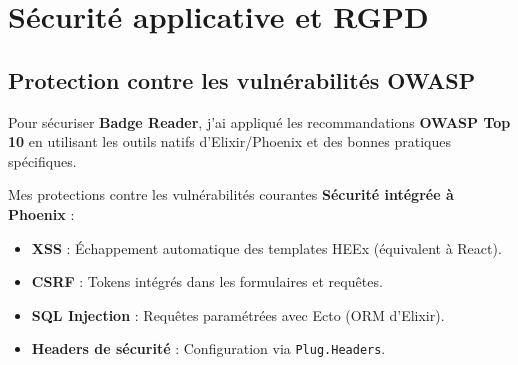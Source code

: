 \chapter{Sécurité applicative et RGPD}

\section{Protection contre les vulnérabilités OWASP}
Pour sécuriser \textbf{Badge Reader}, j’ai appliqué les recommandations \textbf{OWASP Top 10} en utilisant les outils natifs d’Elixir/Phoenix et des bonnes pratiques spécifiques.
\newline

\begin{for_you}{Mes protections contre les vulnérabilités courantes}
    \textbf{Sécurité intégrée à Phoenix} :
    \begin{itemize}
        \item \textbf{XSS} : Échappement automatique des templates HEEx (équivalent à React).
        \item \textbf{CSRF} : Tokens intégrés dans les formulaires et requêtes.
        \item \textbf{SQL Injection} : Requêtes paramétrées avec Ecto (ORM d’Elixir).
        \item \textbf{Headers de sécurité} : Configuration via \texttt{Plug.Headers}.
    \end{itemize}
\end{for_you}
\textit{\newline}
